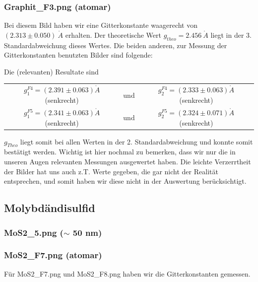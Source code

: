 \subsubsection{Graphit\_F3.png (atomar)}

Bei diesem Bild haben wir eine Gitterkonstante waagerecht von $(2.313 \pm 0.050)\ \mathring{A}$ erhalten. Der theoretische Wert $g_{theo}=2.456\ \mathring A$ liegt in der 3. Standardabweichung dieses Wertes. Die beiden anderen, zur Messung der Gitterkonstanten benutzten Bilder sind folgende:


Die (relevanten) Resultate sind\\

\begin{tabular}{c c c}
	$g^{F4}_1 = (2.391 \pm 0.063) \mathring{A}$ (senkrecht) & und & $g^{F4}_2 = (2.333 \pm 0.063) \mathring{A}$ (senkrecht)\\
	$g^{F5}_1 = (2.341 \pm 0.063) \mathring{A}$ (senkrecht) & und & $g^{F5}_2 = (2.324 \pm 0.071) \mathring{A}$ (senkrecht)\\
\end{tabular}


$g_{Theo}$ liegt somit bei allen Werten in der 2. Standardabweichung und konnte somit bestätigt werden. Wichtig ist hier nochmal zu bemerken, dass wir nur die in unseren Augen relevanten Messungen ausgewertet haben. Die leichte Verzerrtheit der Bilder hat uns auch z.T. Werte gegeben, die gar nicht der Realität entsprechen, und somit haben wir diese nicht in der Auswertung berücksichtigt.

\subsection{Molybdändisulfid}

\subsubsection{MoS2\_5.png ($\sim$ 50 nm)}
\subsubsection{MoS2\_F7.png (atomar)}

Für MoS2\_F7.png und MoS2\_F8.png haben wir die Gitterkonstanten gemessen.

